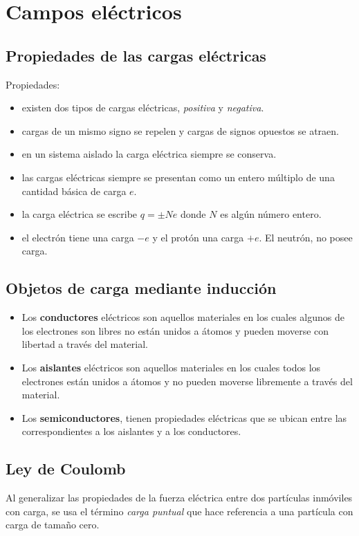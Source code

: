 \section{Campos eléctricos}

  \subsection{Propiedades de las cargas eléctricas}
    \PN Propiedades:
    \begin{itemize}
      \item existen dos tipos de cargas eléctricas, \textit{positiva} y \textit{negativa}.
      \item cargas de un mismo signo se repelen y cargas de signos opuestos se atraen.
      \item en un sistema aislado la carga eléctrica siempre se conserva.
      \item las cargas eléctricas siempre se presentan como un entero múltiplo de una cantidad básica de carga $e$.
      \item la carga eléctrica se escribe $q = \pm Ne$ donde $N$ es algún número entero.
      \item el electrón tiene una carga $-e$ y el protón una carga $+e$. El neutrón, no posee carga.
    \end{itemize}

  \subsection{Objetos de carga mediante inducción}
    \begin{itemize}
      \item Los \textbf{conductores} eléctricos son aquellos materiales en los cuales algunos de los electrones son
      libres no están unidos a átomos y pueden moverse con libertad a través del material.
      \item Los \textbf{aislantes} eléctricos son aquellos materiales en los cuales todos los electrones están unidos a
      átomos y no pueden moverse libremente a través del material.
      \item Los \textbf{semiconductores}, tienen propiedades eléctricas que se ubican entre las correspondientes a los
      aislantes y a los conductores.
    \end{itemize}

  \subsection{Ley de Coulomb}
    \PN Al generalizar las propiedades de la fuerza eléctrica entre dos partículas inmóviles con carga, se usa el
    término \textit{carga puntual} que hace referencia a una partícula con carga de tamaño cero.

